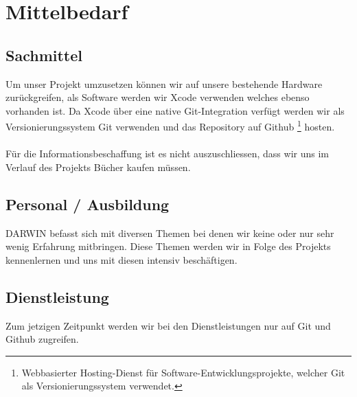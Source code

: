 \section{Mittelbedarf}
	
\subsection{Sachmittel}
	
Um unser Projekt umzusetzen können wir auf unsere bestehende Hardware zurückgreifen, als Software werden wir Xcode verwenden welches ebenso vorhanden ist. 
Da Xcode über eine native Git-Integration verfügt werden wir als Versionierungssystem Git verwenden und das Repository auf Github
\footnote{Webbasierter Hosting-Dienst für Software-Entwicklungsprojekte, welcher Git als Versionierungssystem verwendet.} hosten. 
\\ \\
Für die Informationsbeschaffung ist es nicht auszuschliessen, dass wir uns im Verlauf des Projekts Bücher kaufen müssen. 
	
\subsection{Personal / Ausbildung}
	
DARWIN befasst sich mit diversen Themen bei denen wir keine oder nur sehr wenig Erfahrung mitbringen. Diese Themen werden wir in Folge des Projekts kennenlernen und uns mit diesen intensiv beschäftigen. 
	
\subsection{Dienstleistung}
Zum jetzigen Zeitpunkt werden wir bei den Dienstleistungen nur auf Git und Github zugreifen.